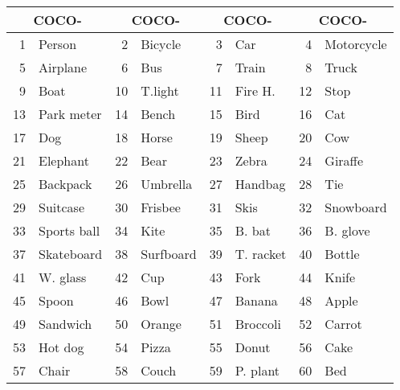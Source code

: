 \documentclass[10pt,twocolumn,letterpaper]{article}
\begin{document}
\begin{table}[b]
\setlength{\tabcolsep}{3pt}
\begin{footnotesize}
\begin{tabular}{rl|rl|rl|rl}
\hline 
\hline
\multicolumn{2}{c|}{COCO-} & \multicolumn{2}{c|}{COCO-} & \multicolumn{2}{c|}{COCO-} & \multicolumn{2}{c}{COCO-} \\ \hline
1       & Person            & 2      & Bicycle           & 3      & Car               & 4      & Motorcycle        \\
5       & Airplane          & 6      & Bus               & 7      & Train             & 8      & Truck             \\
9       & Boat              & 10     & T.light     & 11     & Fire H.      & 12     & Stop          \\
13      & Park meter     & 14     & Bench             & 15     & Bird              & 16     & Cat               \\
17      & Dog               & 18     & Horse             & 19     & Sheep             & 20     & Cow               \\
21      & Elephant          & 22     & Bear              & 23     & Zebra             & 24     & Giraffe           \\
25      & Backpack          & 26     & Umbrella          & 27     & Handbag           & 28     & Tie               \\
29      & Suitcase          & 30     & Frisbee           & 31     & Skis              & 32     & Snowboard         \\
33      & Sports ball       & 34     & Kite              & 35     & B. bat      & 36     & B. glove    \\
37      & Skateboard        & 38     & Surfboard         & 39     & T. racket     & 40     & Bottle            \\
41      & W. glass        & 42     & Cup               & 43     & Fork              & 44     & Knife             \\
45      & Spoon             & 46     & Bowl              & 47     & Banana            & 48     & Apple             \\
49      & Sandwich          & 50     & Orange            & 51     & Broccoli          & 52     & Carrot            \\
53      & Hot dog           & 54     & Pizza             & 55     & Donut             & 56     & Cake              \\
57      & Chair             & 58     & Couch             & 59     & P. plant      & 60     & Bed               \\

\end{tabular}
\end{footnotesize}
\end{table}
\end{document}
